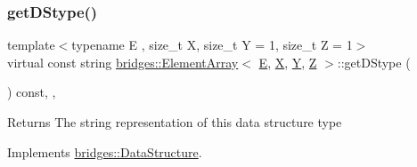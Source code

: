 \subsubsection{\texorpdfstring{getDStype()}{getDStype()}}
{\footnotesize\ttfamily template$<$typename E , size\+\_\+t X, size\+\_\+t Y = 1, size\+\_\+t Z = 1$>$ \\
virtual const string \mbox{\hyperlink{classbridges_1_1_element_array}{bridges\+::\+Element\+Array}}$<$ \mbox{\hyperlink{namespacebridges_acfb0a4f7877d8f63de3e6862004c50eda3a3ea00cfc35332cedf6e5e9a32e94da}{E}}, \mbox{\hyperlink{namespacebridges_acfb0a4f7877d8f63de3e6862004c50eda02129bb861061d1a052c592e2dc6b383}{X}}, \mbox{\hyperlink{namespacebridges_acfb0a4f7877d8f63de3e6862004c50eda57cec4137b614c87cb4e24a3d003a3e0}{Y}}, \mbox{\hyperlink{namespacebridges_acfb0a4f7877d8f63de3e6862004c50eda21c2e59531c8710156d34a3c30ac81d5}{Z}} $>$\+::get\+D\+Stype (\begin{DoxyParamCaption}{ }\end{DoxyParamCaption}) const\hspace{0.3cm}{\ttfamily [inline]}, {\ttfamily [override]}, {\ttfamily [virtual]}}

\begin{DoxyReturn}{Returns}
The string representation of this data structure type 
\end{DoxyReturn}


Implements \mbox{\hyperlink{classbridges_1_1_data_structure_a957a63b106e340bc753620c650632bdc}{bridges\+::\+Data\+Structure}}.

\mbox{\label{classbridges_1_1_element_array_a45bac55f6f64a90eb61fd3faaf1aaffe}} 
